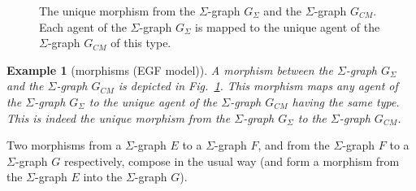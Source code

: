 \documentclass{entcs}
\newcommand{\graphsymb}{G}
\newtheorem{myexample}[thm]{Example}
\begin{document}
\begin{figure}[t]
\hfill{}\hfill\mbox{}
\caption{The unique morphism from the $\Sigma$-graph $\graphsymb_{\Sigma}$
and the $\Sigma$-graph $\graphsymb_{\textit{CM}}$. Each agent of the $\Sigma$-graph $\graphsymb_{\Sigma}$ is mapped to the unique agent of the $\Sigma$-graph $\graphsymb_{\textit{CM}}$ of this type.}
  \label{fig:egfr:embed}
\end{figure}
\begin{myexample}[morphisms (EGF model)]

A morphism between the $\Sigma$-graph $\graphsymb_{\Sigma}$ and the $\Sigma$-graph $\graphsymb_{\textit{CM}}$ is depicted in Fig.~\ref{fig:egfr:embed}. This morphism maps any agent of the $\Sigma$-graph
$\graphsymb_{\Sigma}$ to the unique agent of the $\Sigma$-graph $\graphsymb_{\textit{CM}}$ having the same type.
This is indeed the unique morphism from the  $\Sigma$-graph
$\graphsymb_{\Sigma}$ to the $\Sigma$-graph $\graphsymb_{\textit{CM}}$.
\end{myexample}


Two morphisms from a $\Sigma$-graph  $E$ to a $\Sigma$-graph $F$, and from the $\Sigma$-graph $F$ to a $\Sigma$-graph $G$ respectively, compose in the usual way (and form a morphism from the $\Sigma$-graph $E$ into the
$\Sigma$-graph  $G$).
\end{document}
